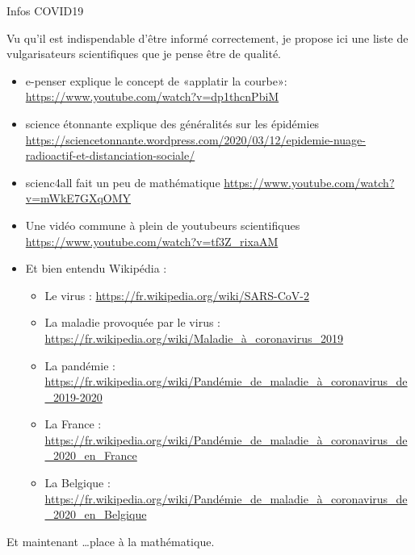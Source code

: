 

\begin{center}
    Infos COVID19
\end{center}

Vu qu'il est indispendable d'être informé correctement, je propose ici une liste de vulgarisateurs scientifiques que je pense être de qualité.

\begin{itemize}
    \item e-penser explique le concept de «applatir la courbe»:  \url{https://www.youtube.com/watch?v=dp1thcnPbiM}
    \item science étonnante explique des généralités sur les épidémies \url{https://sciencetonnante.wordpress.com/2020/03/12/epidemie-nuage-radioactif-et-distanciation-sociale/}
    \item scienc4all fait un peu de mathématique \url{https://www.youtube.com/watch?v=mWkE7GXqOMY}
    \item Une vidéo commune à plein de youtubeurs scientifiques  \url{https://www.youtube.com/watch?v=tf3Z_rixaAM}
    \item Et bien entendu Wikipédia :
        \begin{itemize}
            \item Le virus : \url{https://fr.wikipedia.org/wiki/SARS-CoV-2}
            \item La maladie provoquée par le virus : \url{https://fr.wikipedia.org/wiki/Maladie_à_coronavirus_2019}
            \item La pandémie : \url{https://fr.wikipedia.org/wiki/Pandémie_de_maladie_à_coronavirus_de_2019-2020}
            \item La France : \url{https://fr.wikipedia.org/wiki/Pandémie_de_maladie_à_coronavirus_de_2020_en_France}
            \item La Belgique : \url{https://fr.wikipedia.org/wiki/Pandémie_de_maladie_à_coronavirus_de_2020_en_Belgique}
        \end{itemize}
\end{itemize}

Et maintenant \ldots place à la mathématique.

\newpage
